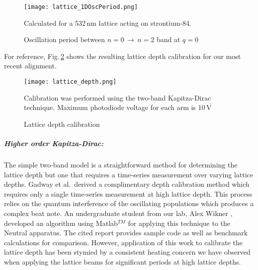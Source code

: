 	\begin{figure}
		\centerline{
		\texttt{[image: lattice\_1DOscPeriod.png]}}
		\caption{Oscillation period between $n=0\,\rightarrow\,n=2$ band at $q=0$}{Calculated for a 532\,nm lattice acting on strontium-84.}
		\label{fig:latOscPeriod}
	\end{figure} 
For reference, Fig.\,\ref{fig:latDepth} shows the resulting lattice depth calibration for our most recent alignment.
	\begin{figure} 
		\centerline{
		\texttt{[image: lattice\_depth.png]}}
		\caption{Lattice depth calibration}{Calibration was performed using the two-band Kapitza-Dirac technique. Maximum photodiode voltage for each arm is 10\,V}
		\label{fig:latDepth}
	\end{figure}
	
\subparagraph{Higher order Kapitza-Dirac:}
The simple two-band model is a straightforward method for determining the lattice depth but one that requires a time-series measurement over varying lattice depths.
Gadway et al.\,\hl{\cite{Gadway2009}} derived a complimentary depth calibration method which requires only a single time-series measurement at high lattice depth.
This process relies on the quantum interference of the oscillating populations which produces a complex beat note.
An undergraduate student from our lab, Alex Wikner \hl{\cite{Wikner2017}}, developed an algorithm using Matlab$^{TM}$ for applying this technique to the Neutral apparatus.
The cited report provides sample code as well as benchmark calculations for comparison.
However, application of this work to calibrate the lattice depth has been stymied by a consistent heating concern we have observed when applying the lattice beams for significant periods at high lattice depths.

